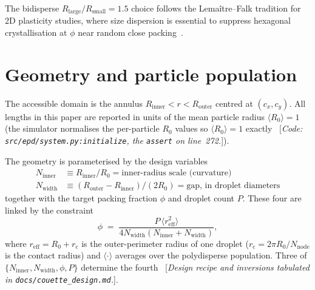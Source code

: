 \documentclass[aps,pre,twocolumn,floatfix,longbibliography]{revtex4-2}
\newcommand{\rc}{r_{\mathrm{c}}}
\newcommand{\reff}{r_{\mathrm{eff}}}
\newcommand{\Ninner}{N_{\mathrm{inner}}}
\newcommand{\Nwidth}{N_{\mathrm{width}}}
\newcommand{\Rinner}{R_{\mathrm{inner}}}
\newcommand{\Router}{R_{\mathrm{outer}}}
\begin{document}
The bidisperse $R_{\mathrm{large}}/R_{\mathrm{small}} = 1.5$ choice
follows the Lemaître--Falk tradition for 2D plasticity studies, where
size dispersion is essential to suppress hexagonal crystallisation at
$\phi$ near random close packing~\cite{falk1998dynamics,lemaitre2009sum}.

\section{Geometry and particle population}
\label{sec:geometry}

The accessible domain is the annulus $\Rinner < r < \Router$ centred at
$(c_x, c_y)$.  All lengths in this paper are reported in units of the
mean particle radius $\langle R_0 \rangle = 1$ (the simulator
normalises the per-particle $R_0$ values so $\langle R_0 \rangle = 1$
exactly~ [\textit{Code: \texttt{src/epd/system.py:initialize}, the
\texttt{assert} on line~272.}]).

The geometry is parameterised by the design variables
\begin{align}
\Ninner &\equiv \Rinner / R_0
   = \text{inner-radius scale (curvature)} \\
\Nwidth &\equiv (\Router - \Rinner) / (2 R_0)
   = \text{gap, in droplet diameters}
\end{align}
together with the target packing fraction $\phi$ and droplet count $P$.
These four are linked by the constraint
\begin{equation}
\phi \;=\; \frac{P \, \langle \reff^2 \rangle}
                {4 \Nwidth (\Ninner + \Nwidth)},
\label{eq:design}
\end{equation}
where $\reff = R_0 + \rc$ is the outer-perimeter radius of one droplet
($\rc = 2\pi R_0 / N_{\mathrm{node}}$ is the contact radius) and
$\langle \cdot \rangle$ averages over the polydisperse population.
Three of $\{\Ninner, \Nwidth, \phi, P\}$ determine the
fourth~ [\textit{Design recipe and inversions tabulated in
\texttt{docs/couette\_design.md}.}].
\end{document}

